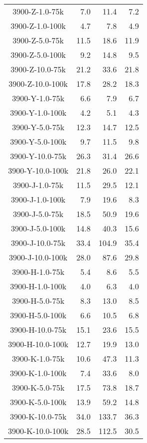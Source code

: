 \begin{longtable}{crrr}
    3900-Z-1.0-75k &   7.0 &   11.4 &   7.2 \\
    3900-Z-1.0-100k &   4.7 &    7.8 &   4.9 \\
    3900-Z-5.0-75k &  11.5 &   18.6 &  11.9 \\
    3900-Z-5.0-100k &   9.2 &   14.8 &   9.5 \\
    3900-Z-10.0-75k &  21.2 &   33.6 &  21.8 \\
    3900-Z-10.0-100k &  17.8 &   28.2 &  18.3 \\
    3900-Y-1.0-75k &   6.6 &    7.9 &   6.7 \\
    3900-Y-1.0-100k &   4.2 &    5.1 &   4.3 \\
    3900-Y-5.0-75k &  12.3 &   14.7 &  12.5 \\
    3900-Y-5.0-100k &   9.7 &   11.5 &   9.8 \\
    3900-Y-10.0-75k &  26.3 &   31.4 &  26.6 \\
    3900-Y-10.0-100k &  21.8 &   26.0 &  22.1 \\
    3900-J-1.0-75k &  11.5 &   29.5 &  12.1 \\
    3900-J-1.0-100k &   7.9 &   19.6 &   8.3 \\
    3900-J-5.0-75k &  18.5 &   50.9 &  19.6 \\
    3900-J-5.0-100k &  14.8 &   40.3 &  15.6 \\
    3900-J-10.0-75k &  33.4 &  104.9 &  35.4 \\
    3900-J-10.0-100k &  28.0 &   87.6 &  29.8 \\
    3900-H-1.0-75k &   5.4 &    8.6 &   5.5 \\
    3900-H-1.0-100k &   4.0 &    6.3 &   4.0 \\
    3900-H-5.0-75k &   8.3 &   13.0 &   8.5 \\
    3900-H-5.0-100k &   6.6 &   10.5 &   6.8 \\
    3900-H-10.0-75k &  15.1 &   23.6 &  15.5 \\
    3900-H-10.0-100k &  12.7 &   19.9 &  13.0 \\
    3900-K-1.0-75k &  10.6 &   47.3 &  11.3 \\
    3900-K-1.0-100k &   7.4 &   33.6 &   8.0 \\
    3900-K-5.0-75k &  17.5 &   73.8 &  18.7 \\
    3900-K-5.0-100k &  13.9 &   59.2 &  14.8 \\
    3900-K-10.0-75k &  34.0 &  133.7 &  36.3 \\
    3900-K-10.0-100k &  28.5 &  112.5 &  30.5 \\

\end{longtable}
